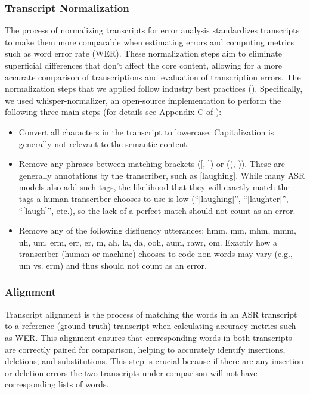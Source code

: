 \documentclass{article}
\begin{document}
\subsubsection{Transcript Normalization}
The process of normalizing transcripts for error analysis standardizes transcripts to make them more comparable when estimating errors and computing metrics such as word error rate (WER). These normalization steps aim to eliminate superficial differences that don't affect the core content, allowing for a more accurate comparison of transcriptions and evaluation of transcription errors. The normalization steps that we applied follow industry best practices (\cite{radford2022robust}). Specifically, we used whisper-normalizer, an open-source implementation to perform the following three main steps (for details see Appendix C of \cite{radford2022robust}): 

\begin{itemize}
  \item Convert all characters in the transcript to lowercase. Capitalization is generally not relevant to the semantic content. 

  \item Remove any phrases between matching brackets ([, ]) or ((, )). These are generally annotations by the transcriber, such as [laughing]. While many ASR models also add such tags, the likelihood that they will exactly match the tags a human transcriber chooses to use is low (“[laughing]”, “[laughter]”, “[laugh]”, etc.), so the lack of a perfect match should not count as an error. 

  \item Remove any of the following disfluency utterances: hmm, mm, mhm, mmm, uh, um, erm, err, er, m, ah, la, da, ooh, aum, rawr, om. Exactly how a transcriber (human or machine) chooses to code non-words may vary (e.g., um vs. erm) and thus should not count as an error. 
\end{itemize}

\subsubsection{Alignment}
Transcript alignment is the process of matching the words in an ASR transcript to a reference (ground truth) transcript when calculating accuracy metrics such as WER. This alignment ensures that corresponding words in both transcripts are correctly paired for comparison, helping to accurately identify insertions, deletions, and substitutions. This step is crucial because if there are any insertion or deletion errors the two transcripts under comparison will not have corresponding lists of words.  
\end{document}
